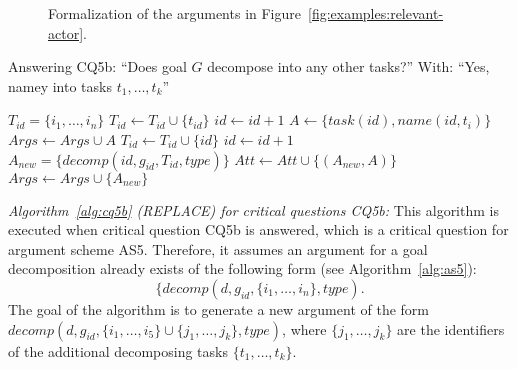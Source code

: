 \begin{figure}[ht!]
\centering
\caption{Formalization of the arguments in Figure~\ref{fig:examples:relevant-actor}.}
\label{fig:examples:relevant-actor:formal}
\end{figure}

\begin{algorithm}[h]
  \caption{Answering CQ5b: ``Does goal $G$ decompose into any other tasks?'' With: ``Yes, namey into tasks $t_1,\ldots,t_k$''}\label{alg:cq5b}
  \begin{algorithmic}[1]
    \State $T_{id} = \{i_1,\ldots,i_n\}$
    \label{alg:cq5b:for1}
        \State $T_{id} \gets T_{id} \cup \{t_{id}\}$
      \Else
        \State $id\gets id+1$
        \State $A \gets \{task(id),name(id,t_i)\}$
        \State $Args \gets Args\cup A$
        \State $T_{id} \gets T_{id} \cup \{id\}$
      \EndIf
    \EndFor
    \State $id\gets id+1$
    \State $A_{new} = \{decomp(id, g_{id}, T_{id}, type)\}$\label{alg:cq5b:newarg}
    \label{alg:cq5b:for2}
      \State $Att\gets Att \cup \{(A_{new},A)\}$
    \EndFor
    \State $Args \gets Args \cup \{A_{new}\}$
    \EndProcedure
  \end{algorithmic}
\end{algorithm}

\emph{Algorithm~\ref{alg:cq5b} (\textsf{REPLACE}) for critical questions CQ5b:} This algorithm is executed when critical question CQ5b is answered, which is a critical question for argument scheme AS5. Therefore, it assumes an argument for a goal decomposition already exists of the following form (see Algorithm~\ref{alg:as5}): $$\{decomp(d, g_{id}, \{i_1,\ldots,i_n\},type).$$  The goal of the algorithm is to generate a new argument of the form $decomp(d, g_{id}, \{i_1,\ldots,i_5\}\cup \{j_1,\ldots,j_k\}, type)$, where $\{j_1,\ldots,j_k\}$ are the identifiers of the additional decomposing tasks $\{t_1,\ldots,t_k\}$.

